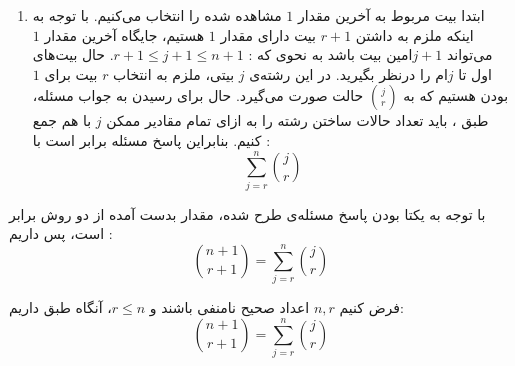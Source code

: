 \begin{PROBLEM}
{\begin{enumerate}
      \item 
      ابتدا بیت مربوط به آخرین مقدار
      $1$
      مشاهده شده را انتخاب می‌کنیم. با توجه به اینکه ملزم به داشتن
      $r+1$
      بیت دارای مقدار
      $1$
      هستیم، جایگاه آخرین مقدار
      $1$
      می‌تواند
      $j+1$امین
      بیت باشد به نحوی که :
      $r+1 \leq j+1 \leq n+1$.
      حال بیت‌های اول تا
      $j$ام
      را درنظر بگیرید. در این رشته‌ی
      $j$ بیتی،
      ملزم به انتخاب
      $r$
      بیت برای
      $1$
      بودن هستیم که به
      $\binom{j}{r}$
      حالت صورت می‌گیرد. حال برای رسیدن به جواب مسئله، طبق 
      ، باید
      تعداد حالات ساختن رشته را به ازای تمام مقادیر ممکن
      $j$
      با هم جمع کنیم. بنابراین پاسخ مسئله برابر است با :
          $$\sum\limits_{j=r}^n \binom{j}{r}$$
      \end{enumerate}
      \p
      با توجه به یکتا بودن پاسخ مسئله‌ی طرح شده، مقدار بدست آمده از دو روش برابر است،
      پس داریم :
      $$\binom{n+1}{r+1} = \sum\limits_{j=r}^n \binom{j}{r}$$
  }
\end{PROBLEM}

\begin{THEOREM}
  \p
  فرض کنیم
  $n,r$
  اعداد صحیح نامنفی باشند و
  $r \leq n$،
  آنگاه طبق
  داریم:
    $$\binom{n+1}{r+1} = \sum\limits_{j=r}^n \binom{j}{r}$$
\end{THEOREM}